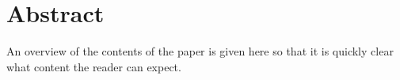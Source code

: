 \chapter*{Abstract}
An overview of the contents of the paper is given here so that it is quickly clear what content the reader can expect.
